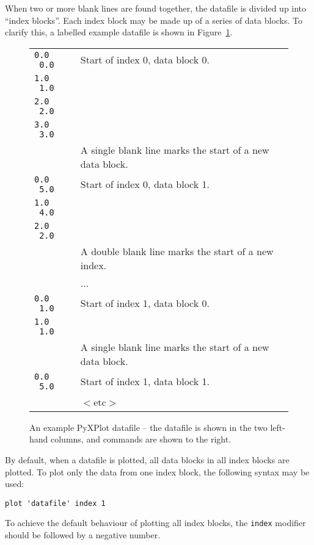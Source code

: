 When two or more blank lines are found together, the datafile is divided up
into ``index blocks''. Each index block may be made up of a series of data
blocks. To clarify this, a labelled example datafile is shown in
Figure~\ref{sample_datafile}.

\begin{figure}
\begin{tabular}{p{2.2cm}l}
\hline
\texttt{0.0 \ 0.0} & Start of index 0, data block 0. \\
\texttt{1.0 \ 1.0} & \\
\texttt{2.0 \ 2.0} & \\
\texttt{3.0 \ 3.0} & \\
                   & A single blank line marks the start of a new data block. \\
\texttt{0.0 \ 5.0} & Start of index 0, data block 1. \\
\texttt{1.0 \ 4.0} & \\
\texttt{2.0 \ 2.0} & \\
                   & A double blank line marks the start of a new index. \\
                   & ... \\
\texttt{0.0 \ 1.0} & Start of index 1, data block 0. \\
\texttt{1.0 \ 1.0} & \\
                   & A single blank line marks the start of a new data block. \\
\texttt{0.0 \ 5.0} & Start of index 1, data block 1. \\
                   & $<$etc$>$ \\
\hline
\end{tabular}
\caption{An example PyXPlot datafile -- the datafile is shown in the two left-hand columns, and commands are shown to the right.}
\label{sample_datafile}
\end{figure}

By default, when a datafile is plotted, all data blocks in all index blocks are
plotted. To plot only the data from one index block, the following syntax may
be used:

\begin{verbatim}
plot 'datafile' index 1
\end{verbatim}

\noindent To achieve the default behaviour of plotting all index blocks, the
\texttt{index} modifier should be followed by a negative number.

